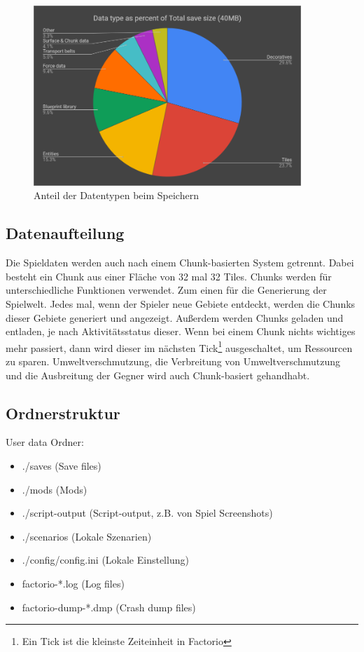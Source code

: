 \begin{figure}[htp]
    \centering
    \includegraphics[width=0.9\textwidth]{images/factorio_save_statistic.png}
    \caption{Anteil der Datentypen beim Speichern\cite{factorioFridayFacts270}}
    \label{fig:factorioSaveStatistic}
\end{figure}



\subsection{Datenaufteilung} \label{ssec:factorioDatenaufteilung}
Die Spieldaten werden auch nach einem Chunk-basierten System getrennt. Dabei besteht ein Chunk aus einer Fläche von 32 mal 32 Tiles. Chunks werden für unterschiedliche Funktionen verwendet. Zum einen für die Generierung der Spielwelt. Jedes mal, wenn der Spieler neue Gebiete entdeckt, werden die Chunks dieser Gebiete generiert und angezeigt. Außerdem werden Chunks geladen und entladen, je nach Aktivitätsstatus dieser. Wenn bei einem Chunk nichts wichtiges mehr passiert, dann wird dieser im nächsten Tick\footnote{Ein Tick ist die kleinste Zeiteinheit in Factorio\cite{factorioTime}} ausgeschaltet, um Ressourcen zu sparen. Umweltverschmutzung, die Verbreitung von Umweltverschmutzung und die Ausbreitung der Gegner wird auch Chunk-basiert gehandhabt. 
\cite{factorioMapStructure}



\subsection{Ordnerstruktur}
User data Ordner:
\begin{itemize}
    \item ./saves (Save files)
    \item ./mods (Mods)
    \item ./script-output (Script-output, z.B. von Spiel Screenshots)
    \item ./scenarios (Lokale Szenarien)
    \item ./config/config.ini (Lokale Einstellung)
    \item factorio-*.log (Log files)
    \item factorio-dump-*.dmp (Crash dump files)
\end{itemize}

